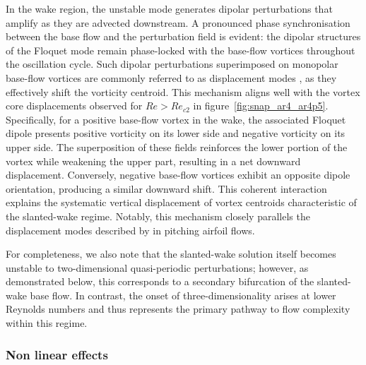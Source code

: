In the wake region, the unstable mode generates dipolar perturbations that amplify as they are advected downstream. A pronounced phase synchronisation between the base flow and the perturbation field is evident: the dipolar structures of the Floquet mode remain phase-locked with the base-flow vortices throughout the oscillation cycle.
%
Such dipolar perturbations superimposed on monopolar base-flow vortices are commonly referred to as displacement modes \citep{brion-sipp-jacquin-2014}, as they effectively shift the vorticity centroid. This mechanism aligns well with the vortex core displacements observed for $Re > Re_{c2}$ in figure~\ref{fig:snap_ar4_ar4p5}. Specifically, for a positive base-flow vortex in the wake, the associated Floquet dipole presents positive vorticity on its lower side and negative vorticity on its upper side. The superposition of these fields reinforces the lower portion of the vortex while weakening the upper part, resulting in a net downward displacement. Conversely, negative base-flow vortices exhibit an opposite dipole orientation, producing a similar downward shift. This coherent interaction explains the systematic vertical displacement of vortex centroids characteristic of the slanted-wake regime.
%
Notably, this mechanism closely parallels the displacement modes described by \citet{jallas-marquet-fabre-2017} in pitching airfoil flows.

For completeness, we also note that the slanted-wake solution itself becomes unstable to two-dimensional quasi-periodic perturbations; however, as demonstrated below, this corresponds to a secondary bifurcation of the slanted-wake base flow. In contrast, the onset of three-dimensionality arises at lower Reynolds numbers and thus represents the primary pathway to flow complexity within this regime.

\subsubsection{Non linear effects}

